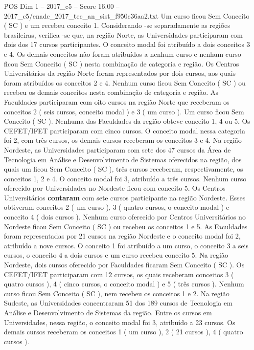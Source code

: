 \begin{textsample}{POS Dim 1 – 2017\_c5 – Score 16.00 – 2017\_c5/enade\_2017\_tec\_an\_sist\_f950c36aa2.txt}
Um curso ficou Sem Conceito ( SC ) e um recebeu conceito 1.
Considerando -se separadamente as regiões brasileiras, verifica -se que, na região Norte, as Universidades participaram com dois dos 17 cursos participantes.
O conceito modal foi atribuído a dois conceitos 3 e 4.
Os demais conceitos não foram atribuídos a nenhum curso e nenhum curso ficou Sem Conceito ( SC ) nesta combinação de categoria e região.
Os Centros Universitários da região Norte foram representados por dois cursos, aos quais foram atribuídos os conceitos 2 e 4.
Nenhum curso ficou Sem Conceito ( SC ) ou recebeu os demais conceitos nesta combinação de categoria e região.
As Faculdades participaram com oito cursos na região Norte que receberam os conceitos 2 ( seis cursos, conceito modal ) e 3 ( um curso ).
Um curso ficou Sem Conceito ( SC ).
Nenhuma das Faculdades da região obteve conceito 1, 4 ou 5.
Os CEFET/IFET participaram com cinco cursos.
O conceito modal nessa categoria foi 2, com três cursos, os demais cursos receberam os conceitos 3 e 4.
Na região Nordeste, as Universidades participaram com sete dos 47 cursos da Área de Tecnologia em Análise e Desenvolvimento de Sistemas oferecidos na região, dos quais um ficou Sem Conceito ( SC ), três cursos receberam, respectivamente, os conceitos 1, 2 e 4.
O conceito modal foi 3, atribuído a três cursos.
Nenhum curso oferecido por Universidades no Nordeste ficou com conceito 5.
Os Centros Universitários \textbf{contaram} com sete cursos participante na região Nordeste.
Esses obtiveram conceitos 2 ( um curso ), 3 ( quatro cursos, o conceito modal ) e conceito 4 ( dois cursos ).
Nenhum curso oferecido por Centros Universitários no Nordeste ficou Sem Conceito ( SC ) ou recebeu os conceitos 1 e 5.
As Faculdades foram representadas por 21 cursos na região Nordeste e o conceito modal foi 2, atribuído a nove cursos.
O conceito 1 foi atribuído a um curso, o conceito 3 a seis cursos, o conceito 4 a dois cursos e um curso recebeu conceito 5.
Na região Nordeste, dois cursos oferecido por Faculdades ficaram Sem Conceito ( SC ).
Os CEFET/IFET participaram com 12 cursos, os quais receberam conceitos 3 ( quatro cursos ), 4 ( cinco cursos, o conceito modal ) e 5 ( três cursos ).
Nenhum curso ficou Sem Conceito ( SC ), nem recebeu os conceitos 1 e 2.
Na região Sudeste, as Universidades concentraram 51 dos 189 cursos de Tecnologia em Análise e Desenvolvimento de Sistemas da região.
Entre os cursos em Universidades, nessa região, o conceito modal foi 3, atribuído a 23 cursos.
Os demais cursos receberam os conceitos 1 ( um curso ), 2 ( 21 cursos ), 4 ( quatro cursos ).

\end{textsample}
